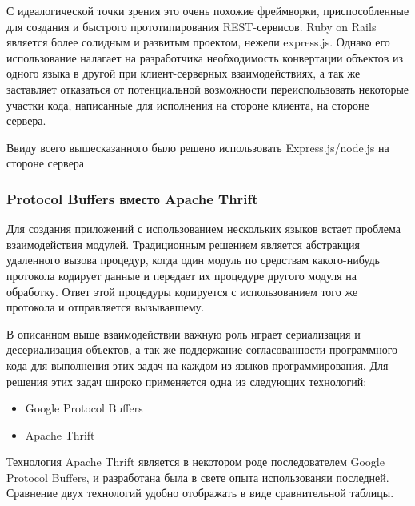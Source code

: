 \documentclass[12pt, a4paper]{article}
\begin{document}
С идеалогической точки зрения это очень похожие фреймворки, приспособленные для
создания и быстрого прототипирования REST-сервисов. Ruby on Rails является
более солидным и развитым проектом, нежели express.js. Однако его использование
налагает на разработчика необходимость конвертации объектов из одного языка в
другой при клиент-серверных взаимодействиях, а так же заставляет отказаться от
потенциальной возможности переиспользовать некоторые участки кода, написанные
для исполнения на стороне клиента, на стороне сервера.

Ввиду всего вышесказанного было решено использовать Express.js/node.js на
стороне сервера

\subsubsection{Protocol Buffers вместо Apache Thrift}
Для создания приложений с использованием нескольких языков встает проблема
взаимодействия модулей. Традиционным решением является абстракция удаленного
вызова процедур, когда один модуль по средствам какого-нибудь протокола кодирует
данные и передает их процедуре другого модуля на обработку. Ответ этой процедуры
кодируется с использованием того же протокола и отправляется вызывавшему.

В описанном выше взаимодействии важную роль играет сериализация и десериализация
объектов, а так же поддержание согласованности программного кода для выполнения
этих задач на каждом из языков программирования. Для решения этих задач широко
применяется одна из следующих технологий:
\begin{itemize}
    \item Google Protocol Buffers
    \item Apache Thrift
\end{itemize}

Технология Apache Thrift является в некотором роде последователем Google
Protocol Buffers, и разработана была в свете опыта использованяи последней. Сравнение двух технологий удобно отображать в виде сравнительной
таблицы.

\begin{center}
\end{center}
\end{document}
